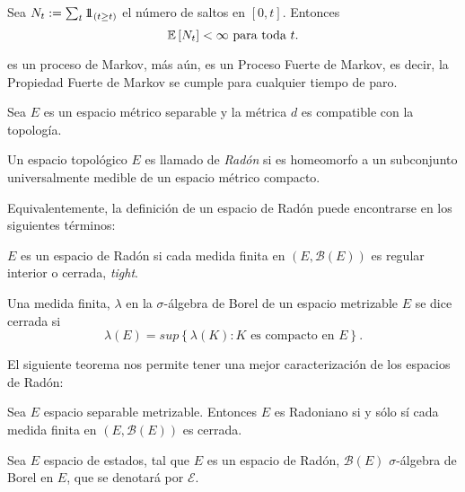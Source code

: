 \begin{Sup}\label{Sup3.1.Davis}
Sea $N_{t}:=\sum_{t}\mbox{$1$\hspace{-0.8ex}$1$}_{\left(t\geq t\right)}$ el n\'umero de
saltos en $\left[0,t\right]$. Entonces
\begin{equation}
\mathbb{E}\left[N_{t}\right]<\infty\textrm{ para toda }t.
\end{equation}
\end{Sup}

es un proceso de Markov, m\'as a\'un, es un Proceso Fuerte de
Markov, es decir, la Propiedad Fuerte de Markov se cumple para
cualquier tiempo de paro.


Sea $E$ es un espacio m\'etrico separable y la m\'etrica $d$ es
compatible con la topolog\'ia.


\begin{Def}
Un espacio topol\'ogico $E$ es llamado de {\em Rad\'on} si es
homeomorfo a un subconjunto universalmente medible de un espacio
m\'etrico compacto.
\end{Def}

Equivalentemente, la definici\'on de un espacio de Rad\'on puede
encontrarse en los siguientes t\'erminos:


\begin{Def}
$E$ es un espacio de Rad\'on si cada medida finita en
$\left(E,\mathcal{B}\left(E\right)\right)$ es regular interior o
cerrada, {\em tight}.
\end{Def}

\begin{Def}
Una medida finita, $\lambda$ en la $\sigma$-\'algebra de Borel de
un espacio metrizable $E$ se dice cerrada si
\begin{equation}\label{Eq.A2.3}
\lambda\left(E\right)=sup\left\{\lambda\left(K\right):K\textrm{ es
compacto en }E\right\}.
\end{equation}
\end{Def}

El siguiente teorema nos permite tener una mejor caracterizaci\'on
de los espacios de Rad\'on:
\begin{Teo}\label{Tma.A2.2}
Sea $E$ espacio separable metrizable. Entonces $E$ es Radoniano si
y s\'olo s\'i cada medida finita en
$\left(E,\mathcal{B}\left(E\right)\right)$ es cerrada.
\end{Teo}

Sea $E$ espacio de estados, tal que $E$ es un espacio de Rad\'on,
$\mathcal{B}\left(E\right)$ $\sigma$-\'algebra de Borel en $E$,
que se denotar\'a por $\mathcal{E}$.

